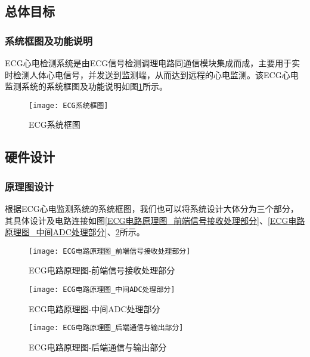 \documentclass{zjureport}
\begin{document}
	\subsection{总体目标}
	
	\subsubsection{系统框图及功能说明}
	
	ECG心电检测系统是由ECG信号检测调理电路同通信模块集成而成，主要用于实时检测人体心电信号，并发送到监测端，从而达到远程的心电监测。该ECG心电监测系统的系统框图及功能说明如图\ref{ECG系统框图}所示。
	
	\begin{figure}[H]
		\centering%
		\texttt{[image: ECG系统框图]}
		\caption{ECG系统框图}%
		\label{ECG系统框图}%
	\end{figure}
	
	\newpage
	
	\subsection{硬件设计}
	
	\subsubsection{原理图设计}
	
	根据ECG心电监测系统的系统框图，我们也可以将系统设计大体分为三个部分，其具体设计及电路连接如图\ref{ECG电路原理图_前端信号接收处理部分}、\ref{ECG电路原理图_中间ADC处理部分}、\ref{ECG电路原理图_后端通信与输出部分}所示。
	
	\begin{figure}[H]
		\centering
		\begin{minipage}[t]{0.49\linewidth}%
			\texttt{[image: ECG电路原理图\_前端信号接收处理部分]}%
			\caption{ECG电路原理图-前端信号接收处理部分}
			\label{ECG电路原理图_前端信号接收处理部分}
		\end{minipage}%
		\begin{minipage}[t]{0.49\linewidth}
			\texttt{[image: ECG电路原理图\_中间ADC处理部分]}
			\caption{ECG电路原理图-中间ADC处理部分}
			\label{ECG电路原理图_中间ADC处理部分}
		\end{minipage}
		
		\begin{minipage}[t]{0.49\linewidth}%
			\texttt{[image: ECG电路原理图\_后端通信与输出部分]}%
			\caption{ECG电路原理图-后端通信与输出部分}
			\label{ECG电路原理图_后端通信与输出部分}
		\end{minipage}%
	\end{figure}
	
\end{document}
